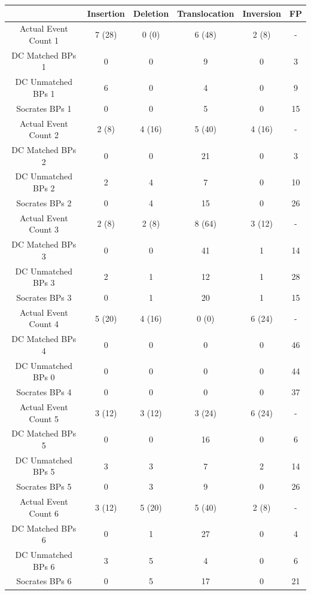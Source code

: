 \documentclass{easychithesis}
\begin{document}
\begin{table}[h]
\begin{center}
\begin{tabular}{|c|c|c|c|c|c|}\hline
         & Insertion & Deletion & Translocation & Inversion & FP \\
        \hline 
        Actual Event Count 1 & 7 (28) & 0 (0) & 6 (48) & 2 (8) & -\\
        DC Matched BPs 1 & 0 & 0 & 9 & 0 & 3\\
        DC Unmatched BPs 1 & 6 & 0 & 4 & 0 & 9\\
        Socrates BPs 1 & 0 & 0 & 5 & 0 & 15\\
        \hline 
        Actual Event Count 2 & 2 (8) & 4 (16) & 5 (40) & 4 (16) & -\\
        DC Matched BPs 2 & 0 & 0 & 21 & 0 & 3\\
        DC Unmatched BPs 2 & 2 & 4 & 7 & 0 & 10\\
        Socrates BPs 2 & 0 & 4 & 15 & 0 & 26\\
        \hline 
        Actual Event Count 3 & 2 (8) & 2 (8) & 8 (64) & 3 (12) & -\\
        DC Matched BPs 3 & 0 & 0 & 41 & 1 & 14\\
        DC Unmatched BPs 3 & 2 & 1 & 12 & 1 & 28\\
        Socrates BPs 3 & 0 & 1 & 20 & 1 & 15\\
        \hline 
        Actual Event Count 4 & 5 (20) & 4 (16) & 0 (0) & 6 (24) & -\\
        DC Matched BPs 4 & 0 & 0 & 0 & 0 & 46\\
        DC Unmatched BPs 0 & 0 & 0 & 0 & 0 & 44\\
        Socrates BPs 4 & 0 & 0 & 0 & 0 & 37\\
        \hline 
        Actual Event Count 5 & 3 (12) & 3 (12) & 3 (24) & 6 (24) & -\\
        DC Matched BPs 5 & 0 & 0 & 16 & 0 & 6\\
        DC Unmatched BPs 5 & 3 & 3 & 7 & 2 & 14\\
        Socrates BPs 5 & 0 & 3 & 9 & 0 & 26\\
         \hline 
        Actual Event Count 6 & 3 (12) & 5 (20) & 5 (40) & 2 (8) & -\\
        DC Matched BPs 6 & 0 & 1 & 27 & 0 & 4\\
        DC Unmatched BPs 6 & 3 & 5 & 4 & 0 & 6\\
        Socrates BPs 6 & 0 & 5 & 17 & 0 & 21\\

\end{tabular}
\end{center}
\end{table}
\end{document}
